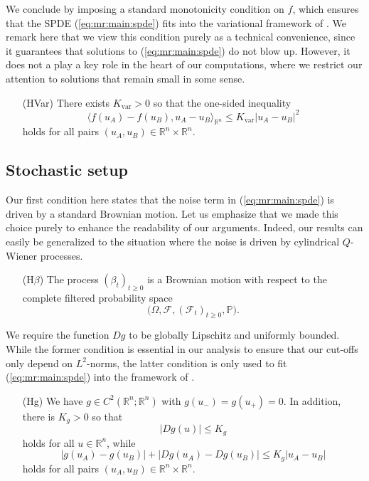 \documentclass[10pt]{articleHJ}
\newcommand{\Real}{\mathbb{R}}							%
\newcommand{\abs}[1]{\left\vert#1\right\vert}			%
\newcommand{\sref}[1]{(\ref{#1})}                       %
\numberwithin{equation}{section}
\begin{document}
We conclude by imposing
a standard monotonicity condition on $f$,
which ensures that the SPDE \sref{eq:mr:main:spde}
fits into the variational framework
of \cite{LiuRockner}. We remark here
that we view this condition purely as a technical
convenience, since it guarantees that solutions
to \sref{eq:mr:main:spde} do not blow up.
However, it does not a play a key role in the heart
of our computations, where we restrict our attention
to solutions that remain small in some sense.

\begin{itemize}
\item[(HVar)]{
 There exists $K_{\mathrm{var}} > 0$ so that the one-sided inequality
 \begin{equation}
    \langle f( u_A ) - f(u_B) , u_A - u_B \rangle_{\Real^n} \le K_{\mathrm{var}} \abs{ u_A - u_B}^2
 \end{equation}
 holds for all pairs $(u_A,u_B) \in \Real^n \times \Real^n$.
}
\end{itemize}







\subsection{Stochastic setup}
\label{sec:mr:stoch}

Our first condition here states
that the noise term in \sref{eq:mr:main:spde}
is driven by a standard Brownian motion.
Let us emphasize that we made this choice purely to enhance
the readability of our arguments.
Indeed, our results can easily be generalized
to the situation where the noise is driven by cylindrical $Q$-Wiener processes.
\begin{itemize}
\item[(H$\beta$)]{
  The process $(\beta_t)_{t \ge 0}$ is a Brownian motion
  with respect to the complete filtered probability space
  \begin{equation}
    \Big(\Omega, \mathcal{F}, ( \mathcal{F}_t)_{t \ge 0} , \mathbb{P} \Big).
  \end{equation}
}
\end{itemize}
%
We require the function $Dg$ to be globally Lipschitz
and uniformly bounded. While
the former condition is essential in our analysis
to ensure that our cut-offs only depend on $L^2$-norms,
the latter condition is only used to
fit \sref{eq:mr:main:spde}
into the framework of \cite{LiuRockner}.
%
\begin{itemize}
\item[(Hg)]{
  We have $g \in C^2(\Real^n; \Real^n)$
  with $g(u_-) = g(u_+) = 0$.
  In addition, there is $K_g > 0$ so that
  \begin{equation}
   \abs{Dg(u)} \le K_g
  \end{equation}
  holds for all $u \in \Real^n$, while
  \begin{equation}
    \abs{g(u_A) - g(u_B)}
    + \abs{Dg(u_A) - Dg(u_B)} \le K_g \abs{u_A - u_B}
  \end{equation}
  holds for all pairs $(u_A,u_B) \in \Real^n \times \Real^n$.
}
\end{itemize}
\end{document}

